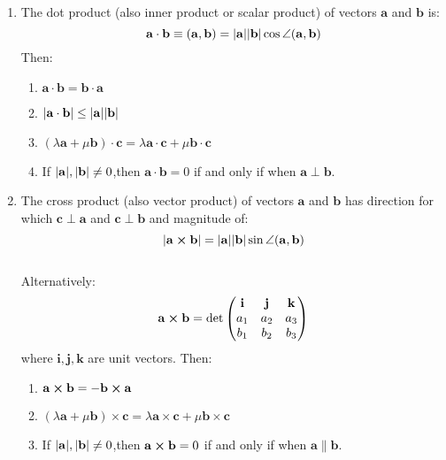 \documentclass{article}
\begin{document}
\begin{enumerate}
\item 
The dot product (also inner product or scalar product) of vectors $\mathbf{a}$ and $\mathbf{b}$ is: \\
$$\mathbf{a} \cdot \mathbf{b} \equiv (\mathbf{a},\mathbf{b}) = \abs{\mathbf{a}} \abs{\mathbf{b}} \cos \angle (\mathbf{a},\mathbf{b}) $$
Then:
\begin{enumerate}
\item 
$\mathbf{a} \cdot \mathbf{b} = \mathbf{b} \cdot \mathbf{a}$
\item 
$\abs{\mathbf{a} \cdot \mathbf{b}} \leq  \abs{\mathbf{a}} \abs{\mathbf{b}} $ 
\item
$(\lambda \mathbf{a} + \mu \mathbf{b}) \cdot \mathbf{c} = \lambda \mathbf{a} \cdot \mathbf{c} + \mu \mathbf{b} \cdot \mathbf{c}$
\item 
If $\abs{\mathbf{a}},\abs{\mathbf{b}} \ne 0$,then $\mathbf{a} \cdot \mathbf{b}=0$ if and only if when $\mathbf{a} \perp \mathbf{b}$.
\end{enumerate}
\item 
The cross product (also vector product) of vectors $\mathbf{a}$ and $\mathbf{b}$ has direction for which $\mathbf{c} \perp \mathbf{a}$ and $\mathbf{c} \perp \mathbf{b}$ and magnitude of: \\
$$\abs{\mathbf{a} \cross \mathbf{b}} = \abs{\mathbf{a}} \abs{\mathbf{b}} \sin \angle (\mathbf{a},\mathbf{b})$$ \\
Alternatively:
$$ \mathbf{a} \cross \mathbf{b} = \det
\left(
\begin{matrix}
\mathbf{i} & \mathbf{j} & \mathbf{k} \\
a_1 & a_2 & a_3 \\
b_1 & b_2 & b_3 
\end{matrix}
\right)
$$
where $\mathbf{i},\mathbf{j},\mathbf{k}$ are unit vectors. Then:
\begin{enumerate}
\item 
$\mathbf{a} \cross \mathbf{b} = - \mathbf{b} \cross \mathbf{a} $
\item 
$(\lambda \mathbf{a} + \mu \mathbf{b}) \times \mathbf{c} = \lambda \mathbf{a} \times \mathbf{c} + \mu \mathbf{b} \times \mathbf{c}$

\item 
If $\abs{\mathbf{a}},\abs{\mathbf{b}} \ne 0$,then $\mathbf{a} \cross \mathbf{b}=0$ if and only if when $\mathbf{a} \parallel \mathbf{b}$.
\end{enumerate}
\end{enumerate}

\newpage
\end{document}
